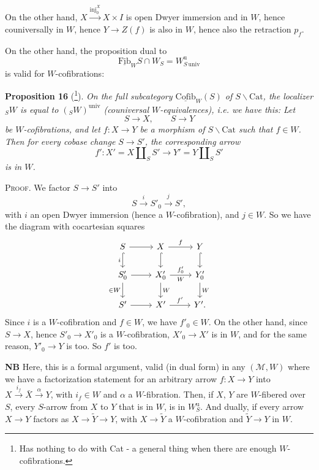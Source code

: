 On the other hand, $X \xrightarrow{\mathrm{inj}_0^X} X \times I$ is open Dwyer immersion and in $W$, hence couniversally in $W$, hence $Y \longrightarrow Z(f)$ is also in $W$, hence also the retraction $p_f$.

On the other hand, the proposition dual to
\[
\underline{\mathrm{Fib}}_W S \cap W_S = W^{\mathrm{u}}_{S\,\mathrm{univ}}
\]
is valid for $W$-cofibrations:

\textbf{Proposition 16} (\footnote[125]{Has nothing to do with Cat - a general thing when there are enough $W$-cofibrations.}). \textit{On the full subcategory $\underline{\mathrm{Cofib}}_W(S)$ of $S\backslash\mathrm{Cat}$, the localizer ${}_SW$ is equal to $({}_SW)^{\mathrm{univ}}$ (couniversal $W$-equivalences), i.e. we have this: Let}
\[
S \longrightarrow X, \qquad S \longrightarrow Y
\]
\textit{be $W$-cofibrations, and let $f : X \longrightarrow Y$ be a morphism of $S\backslash\mathrm{Cat}$ such that $f \in W$. Then for every cobase change $S \longrightarrow S'$, the corresponding arrow}
\[
f' : X' = X \amalg_S S' \longrightarrow Y' = Y \amalg_S S'
\]
\textit{is in $W$.}

\textsc{Proof}. We factor $S \longrightarrow S'$ into
\[
S \xrightarrow{i} S'_0 \xrightarrow{j} S',
\]
with $i$ an open Dwyer immersion (hence a $W$-cofibration), and $j \in W$. So we have the diagram with cocartesian squares
\[
\begin{tikzcd}
S \arrow[r] \arrow[d, hook, "i"'] & X \arrow[r, "f"] \arrow[d, hook] & Y \arrow[d, hook] \\
S'_0 \arrow[r] \arrow[d, "\in W"'] & X'_0 \arrow[r, "f'_0", "W"'] \arrow[d, "W"] & Y'_0 \arrow[d, "W"] \\
S' \arrow[r] & X' \arrow[r, "f'"] & Y'.
\end{tikzcd}
\]
Since $i$ is a $W$-cofibration and $f \in W$, we have $f'_0 \in W$. On the other hand, since $S \longrightarrow X$, hence $S'_0 \longrightarrow X'_0$ is
a $W$-cofibration, $X'_0 \longrightarrow X'$ is in $W$, and for the same reason, $Y'_0 \longrightarrow Y$ is too. So $f'$ is too. %

\textbf{NB} Here, this is a formal argument, valid (in dual form) in any $(\mathcal{M}, W)$ where we have a factorization statement for an arbitrary arrow $f : X \longrightarrow Y$ into $X \xrightarrow{i_f} \bar{X} \xrightarrow{\alpha} Y$, with $i_f \in W$ and $\alpha$ a $W$-fibration. Then, if $X$, $Y$ are $W$-fibered over $S$, every $S$-arrow from $X$ to $Y$ that is in $W$, is in $W^{\mathrm{u}}_S$. And dually, if every arrow $X \longrightarrow Y$ factors as $X \longrightarrow \tilde{Y} \longrightarrow Y$, with $X \longrightarrow \tilde{Y}$ a $W$-cofibration and $\tilde{Y} \longrightarrow Y$ in $W$.

